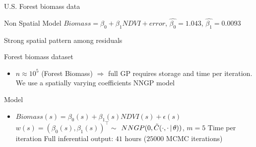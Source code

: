 \begin{frame}{U.S. Forest biomass data}
  \begin{block}{Non Spatial Model}
$Biomass = \beta_0 + \beta_1 NDVI + error$, \hskip 2mm $\hat {\beta_0} = 1.043$, $\hat {\beta_1} = 0.0093$
\end{block}
\vskip-4mm
\begin{figure}[]
\begin{center}
\label{fig:biononsp}
\end{center}
\end{figure}
\begin{alertblock}{\centering Strong spatial pattern among residuals}
\end{alertblock}
\end{frame}

\begin{frame}{Forest biomass dataset}
\begin{itemize}
\item $n \approx 10^5$ (Forest Biomass) $\Rightarrow$ full GP requires storage  and time  per iteration.
\myitem We use a spatially varying coefficients NNGP model
\end{itemize}

\begin{block}{Model}
\begin{itemize}
\item $Biomass(s)= \beta_0(s)+\beta_1(s)NDVI(s)+\epsilon(s)$
\myitem $w(s)=(\beta_0(s),\beta_1(s))^{\top} \sim $  $NNGP(0,\tilde C(\cdot,\cdot \,|\, \theta))$, $m=5$
\myitem Time  per iteration
\myitem Full inferential output: $41$ hours ($25000$ MCMC iterations)
\end{itemize}
\end{block}
\end{frame}

